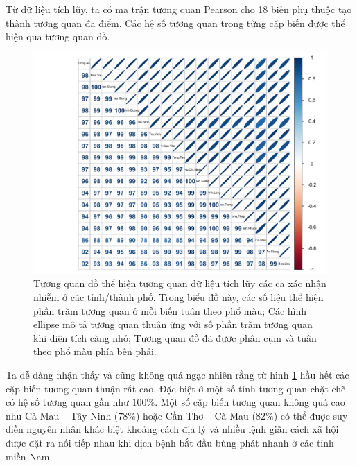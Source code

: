 \documentclass[../thesis.tex]{subfiles}
\begin{document}
\newpage

Từ dữ liệu tích lũy, ta có ma trận tương quan Pearson cho 18 biến phụ thuộc tạo thành tương quan đa điểm. Các hệ số tương quan trong từng cặp biến được thể hiện qua tương quan đồ.

\begin{Shaded}
	\begin{Highlighting}[]
\SpecialCharTok{::}\OtherTok{\textless{}{-}} \SpecialCharTok{\%\textgreater{}\%} \NormalTok{()}\NormalTok{, }
		 \NormalTok{, }
		 \NormalTok{, }
		\NormalTok{,}
		 \NormalTok{,}
		\NormalTok{)}
	\end{Highlighting}
\end{Shaded}

\begin{figure}[H]
	\centering
	\includegraphics[width=0.8\linewidth]{images/corr_cul}
	\caption[Tương quan đồ thể hiện tương quan dữ liệu tích lũy các ca xác nhận nhiễm]{Tương quan đồ thể hiện tương quan dữ liệu tích lũy các ca xác nhận nhiễm ở các tỉnh/thành phố. Trong biểu đồ này, các số liệu thể hiện phần trăm tương quan ở mỗi biến tuân theo phổ màu; Các hình ellipse mô tả tương quan thuận ứng với số phần trăm tương quan khi diện tích càng nhỏ; Tương quan đồ đã được phân cụm và tuân theo phổ màu phía bên phải.}
	\label{fig:corrcul}
\end{figure}

Ta dễ dàng nhận thấy và cũng không quá ngạc nhiên rằng từ hình \ref{fig:corrcul} hầu hết các cặp biến tương quan thuận rất cao. Đặc biệt ở một số tỉnh tương quan chặt chẽ có hệ số tương quan gần như $ 100\% $. Một số cặp biến tương quan không quá cao như Cà Mau -- Tây Ninh ($ 78\% $) hoặc Cần Thơ -- Cà Mau ($ 82\% $) có thể được suy diễn nguyên nhân khác biệt khoảng cách địa lý và nhiều lệnh giãn cách xã hội được đặt ra nối tiếp nhau khi dịch bệnh bắt đầu bùng phát nhanh ở các tỉnh miền Nam. 
\end{document}
